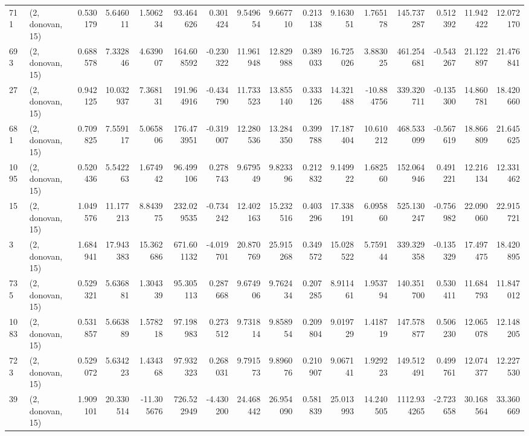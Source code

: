 \begin{tabular}{llrrrrrrrrrrrrrr}
711  &  (2, donovan, 15) &   0.530179 &   5.646011 &   1.506234 &     93.464626 &    0.301424 &    9.549654 &    9.667710 &  0.213138 &   9.163051 &   1.765178 &   145.737287 &   0.512392 &  11.942422 &  12.072170 \\
693  &  (2, donovan, 15) &   0.688578 &   7.332846 &   4.639007 &    164.608592 &   -0.230322 &   11.961948 &   12.829988 &  0.389033 &  16.725026 &   3.883025 &   461.254681 &  -0.543267 &  21.122897 &  21.476841 \\
27   &  (2, donovan, 15) &   0.942125 &  10.032937 &   7.368131 &    191.964916 &   -0.434790 &   11.733523 &   13.855140 &  0.333126 &  14.321488 & -10.884756 &   339.320711 &  -0.135300 &  14.860781 &  18.420660 \\
681  &  (2, donovan, 15) &   0.709825 &   7.559117 &   5.065806 &    176.473951 &   -0.319007 &   12.280536 &   13.284350 &  0.399788 &  17.187404 &  10.610212 &   468.533099 &  -0.567619 &  18.866809 &  21.645625 \\
1095 &  (2, donovan, 15) &   0.520436 &   5.542263 &   1.674942 &     96.499106 &    0.278743 &    9.679549 &    9.823396 &  0.212832 &   9.149922 &   1.682560 &   152.064946 &   0.491221 &  12.216134 &  12.331462 \\
15   &  (2, donovan, 15) &   1.049576 &  11.177213 &   8.843975 &    232.029535 &   -0.734242 &   12.402163 &   15.232516 &  0.403296 &  17.338191 &   6.095860 &   525.130247 &  -0.756982 &  22.090060 &  22.915721 \\
3    &  (2, donovan, 15) &   1.684941 &  17.943383 &  15.362686 &    671.601132 &   -4.019701 &   20.870769 &   25.915268 &  0.349572 &  15.028522 &   5.759144 &   339.329358 &  -0.135329 &  17.497475 &  18.420895 \\
735  &  (2, donovan, 15) &   0.529321 &   5.636881 &   1.304339 &     95.305113 &    0.287668 &    9.674906 &    9.762434 &  0.207285 &   8.911461 &   1.953794 &   140.351700 &   0.530411 &  11.684793 &  11.847012 \\
1083 &  (2, donovan, 15) &   0.531857 &   5.663889 &   1.578218 &     97.198983 &    0.273512 &    9.731814 &    9.858954 &  0.209804 &   9.019729 &   1.418719 &   147.578877 &   0.506230 &  12.065078 &  12.148205 \\
723  &  (2, donovan, 15) &   0.529072 &   5.634223 &   1.434368 &     97.932323 &    0.268031 &    9.791573 &    9.896076 &  0.210907 &   9.067141 &   1.929223 &   149.512491 &   0.499761 &  12.074377 &  12.227530 \\
39   &  (2, donovan, 15) &   1.909101 &  20.330514 & -11.305676 &    726.522949 &   -4.430200 &   24.468442 &   26.954090 &  0.581839 &  25.013993 &  14.240505 &  1112.934265 &  -2.723658 &  30.168564 &  33.360669 \\

\end{tabular}
